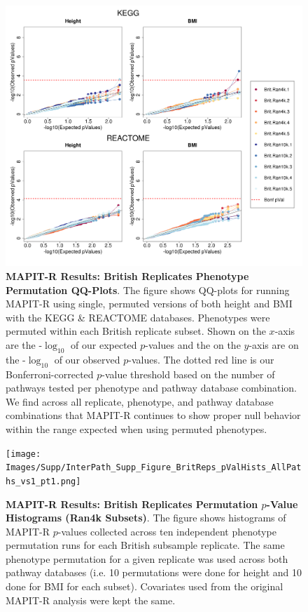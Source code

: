 \documentclass[12pt, a4paper]{article}
\begin{document}
\begin{figure}[htbp]
\centering
\includegraphics[scale=.35]{Images/Supp/InterPath_Supp_Figure_BritReps_perm1_QQPlots_AllPaths_vs1.png}
\caption[TBD]{\textbf{MAPIT-R Results: British Replicates Phenotype Permutation QQ-Plots}. The figure shows QQ-plots for running MAPIT-R using single, permuted versions of both height and BMI with the KEGG \& REACTOME databases. Phenotypes were permuted within each British replicate subset. Shown on the $x$-axis are the -$\log_{10}$ of our expected $p$-values and the on the $y$-axis are on the -$\log_{10}$ of our observed $p$-values. The dotted red line is our Bonferroni-corrected $p$-value threshold based on the number of pathways tested per phenotype and pathway database combination. We find across all replicate, phenotype, and pathway database combinations that MAPIT-R continues to show proper null behavior within the range expected when using permuted phenotypes.}
\label{InterPath-Supp-Figure-BritReps-perm1-QQPlots-AllPaths}
\end{figure}
\clearpage

\setcounter{CharNumber3}{1}
\renewcommand{\thefigure}{\arabic{figure}\alph{CharNumber3}}
\setlength{\footskip}{1cm}
\begin{figure}[htbp]
\centering
\vspace*{-1cm}
\texttt{[image: Images/Supp/InterPath\_Supp\_Figure\_BritReps\_pValHists\_AllPaths\_vs1\_pt1.png]}
\caption[TBD]{\textbf{MAPIT-R Results: British Replicates Permutation $p$-Value Histograms (Ran4k Subsets)}. The figure shows histograms of MAPIT-R $p$-values collected across ten independent phenotype permutation runs for each British subsample replicate. The same phenotype permutation for a given replicate was used across both pathway databases (i.e. 10 permutations were done for height and 10 done for BMI for each subset). Covariates used from the original MAPIT-R analysis were kept the same.}
\label{InterPath-Supp-Figure-BritReps-10perms-pValHists-pt1}
\end{figure}
\clearpage
\setlength{\footskip}{1cm}
\addtocounter{figure}{-1}
\addtocounter{CharNumber3}{1}
\end{document}
